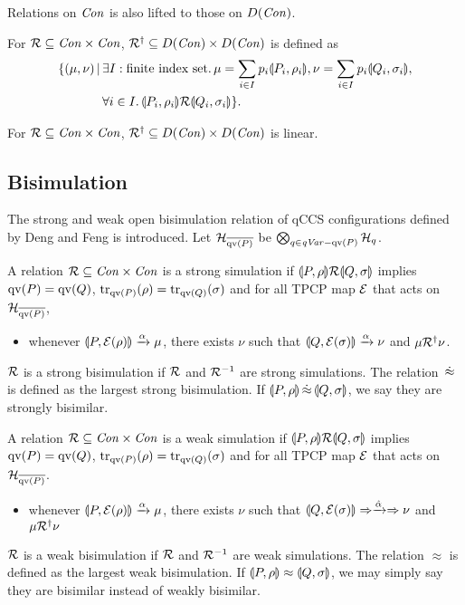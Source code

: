 Relations on $\mathit{Con}$ is also lifted to those on $D(\mathit{Con})$.

\begin{defi}
For $\mathcal{R} \subseteq \mathit{Con} \times \mathit{Con}$, $\mathcal{R}^\dagger \subseteq D(\mathit{Con}) \times
D(\mathit{Con})$ is defined as
\begin{align*}
 \{(\mu, \nu) \,|\, & \exists I:\mbox{finite index set}.\,\mu = \sum_{i \in
 I}p_i \llparenthesis P_i, \rho_i \rrparenthesis, \nu = \sum_{i \in I} p_i \llparenthesis Q_i, \sigma_i \rrparenthesis,\\
 &\forall i \in I. \, \llparenthesis P_i, \rho_i \rrparenthesis \mathcal{R} \llparenthesis Q_i, \sigma_i \rrparenthesis\}.
\end{align*}
\end{defi}

\begin{prop}
  For $\mathcal{R} \subseteq \mathit{Con} \times \mathit{Con}$, $\mathcal{R}^\dagger \subseteq D(\mathit{Con}) \times
D(\mathit{Con})$ is linear.
\end{prop}

\subsection{Bisimulation}
The strong and weak open bisimulation relation of qCCS configurations
defined by
Deng and Feng \cite{DengFeng2012} is introduced.
Let $\mathcal{H}_{\overline{\mathrm{qv}(P)}}$ be $\bigotimes_{q \in \mathit{\mathit{qVar}}-
\mathrm{qv}(P)}\mathcal{H}_q$.

\begin{defi}
A relation $\mathcal{R} \subseteq \mathit{Con} \times \mathit{Con}$ is a strong simulation
 if
 $\llparenthesis P, \rho \rrparenthesis \mathcal{R} \llparenthesis Q, \sigma \rrparenthesis$
implies $\mathrm{qv}(P)=\mathrm{qv}(Q)$, ${\rm tr}_{\mathrm{qv}(P)}(\rho)={\rm tr}_{\mathrm{qv}(Q)}(\sigma)$ and
for all TPCP map $\mathcal{E}$ that acts on $\mathcal{H}_{\overline{\mathrm{qv}(P)}}$,
\begin{itemize}
\item whenever $\llparenthesis P, \mathcal{E}(\rho) \rrparenthesis \xrightarrow{\alpha} \mu$,
      there exists $\nu$ such that
      $\llparenthesis Q, \mathcal{E}(\sigma) \rrparenthesis
      \xrightarrow{\alpha} \nu$ and $\mu \mathcal{R}^\dagger
      \nu$.
\end{itemize}
$\mathcal{R}$ is a strong bisimulation if $\mathcal{R}$ and $\mathcal{R}^{-1}$ are strong simulations. 
The relation $\,\dot\approx\,$ is defined as the largest strong bisimulation.
 If $\llparenthesis P, \rho \rrparenthesis \,\dot\approx\,
 \llparenthesis Q, \sigma \rrparenthesis$, we say they are strongly bisimilar.
\end{defi}

\begin{defi}
A relation $\mathcal{R} \subseteq \mathit{Con} \times \mathit{Con}$ is a weak  
simulation if $\llparenthesis P, \rho \rrparenthesis \mathcal{R} \llparenthesis Q, \sigma \rrparenthesis$
implies $\mathrm{qv}(P)=\mathrm{qv}(Q)$, ${\rm tr}_{\mathrm{qv}(P)}(\rho)={\rm tr}_{\mathrm{qv}(Q)}(\sigma)$ and
for all TPCP map $\mathcal{E}$ that acts on $\mathcal{H}_{\overline{\mathrm{qv}(P)}}$.
\begin{itemize}
\item whenever $\llparenthesis P, \mathcal{E}(\rho) \rrparenthesis \xrightarrow{\alpha} \mu$,
      there exists $\nu$ such that
      $\llparenthesis Q, \mathcal{E}(\sigma) \rrparenthesis\Rightarrow
      \xrightarrow{\hat \alpha} \Rightarrow \nu$ and $\mu \mathcal{R}^\dagger
      \nu$
\end{itemize}
$\mathcal{R}$ is a weak bisimulation if $\mathcal{R}$ and $\mathcal{R}^{-1}$ are weak simulations.
The relation $\approx$ is defined as
the largest weak bisimulation. If $\llparenthesis P, \rho \rrparenthesis \approx
 \llparenthesis Q, \sigma \rrparenthesis$, we may simply say they are bisimilar instead of
weakly bisimilar.
\end{defi}

